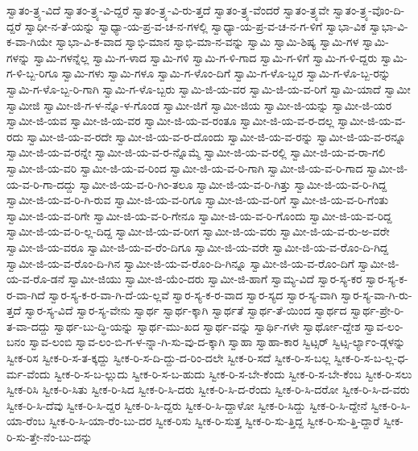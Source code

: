 {ಸ್ವಾತಂ-ತ್ರ್ಯ-ವಿದೆ
ಸ್ವಾತಂ-ತ್ರ್ಯ-ವಿ-ದ್ದರೆ
ಸ್ವಾತಂ-ತ್ರ್ಯ-ವಿ-ರು-ತ್ತದೆ
ಸ್ವಾತಂ-ತ್ರ್ಯ-ವೆಂದರೆ
ಸ್ವಾತಂ-ತ್ರ್ಯವೇ
ಸ್ವಾತಂ-ತ್ರ್ಯ-ವೊಂ-ದಿ-ದ್ದರೆ
ಸ್ವಾಧೀ-ನ-ತೆ-ಯನ್ನು
ಸ್ವಾಧ್ಯಾ-ಯ-ಪ್ರ-ವ-ಚ-ನ-ಗಳಲ್ಲಿ
ಸ್ವಾಧ್ಯಾ-ಯ-ಪ್ರ-ವ-ಚ-ನ-ಗ-ಳಿಗೆ
ಸ್ವಾಭಾ-ವಿಕ
ಸ್ವಾಭಾ-ವಿ-ಕ-ವಾ-ಗಿಯೇ
ಸ್ವಾಭಾ-ವಿ-ಕ-ವಾದ
ಸ್ವಾಭಿ-ಮಾನ
ಸ್ವಾಭಿ-ಮಾ-ನ-ವನ್ನು
ಸ್ವಾಮಿ
ಸ್ವಾಮಿ-ಶಿಷ್ಯ
ಸ್ವಾಮಿ-ಗಳ
ಸ್ವಾಮಿ-ಗಳನ್ನು
ಸ್ವಾಮಿ-ಗಳನ್ನೆಲ್ಲ
ಸ್ವಾಮಿ-ಗ-ಳಾದ
ಸ್ವಾಮಿ-ಗಳಿ
ಸ್ವಾಮಿ-ಗ-ಳಿ-ಗಾದ
ಸ್ವಾಮಿ-ಗ-ಳಿಗೆ
ಸ್ವಾಮಿ-ಗ-ಳಿ-ದ್ದರು
ಸ್ವಾಮಿ-ಗ-ಳಿ-ಬ್ಬ-ರಿಗೂ
ಸ್ವಾಮಿ-ಗಳು
ಸ್ವಾಮಿ-ಗಳೂ
ಸ್ವಾಮಿ-ಗ-ಳೊಂ-ದಿಗೆ
ಸ್ವಾಮಿ-ಗ-ಳೊ-ಬ್ಬರ
ಸ್ವಾಮಿ-ಗ-ಳೊ-ಬ್ಬ-ರನ್ನು
ಸ್ವಾಮಿ-ಗ-ಳೊ-ಬ್ಬ-ರಿ-ಗಾಗಿ
ಸ್ವಾಮಿ-ಗ-ಳೊ-ಬ್ಬರು
ಸ್ವಾಮಿ-ಜಿ-ಯ-ವರ
ಸ್ವಾಮಿ-ಜಿ-ಯ-ವ-ರಿಗೆ
ಸ್ವಾಮಿ-ಯಾದೆ
ಸ್ವಾಮೀ
ಸ್ವಾಮೀಜಿ
ಸ್ವಾಮೀ-ಜಿ-ಗ-ಳ-ನ್ನೊ-ಳ-ಗೊಂಡ
ಸ್ವಾಮೀ-ಜಿಗೆ
ಸ್ವಾಮೀ-ಜಿಯ
ಸ್ವಾಮೀ-ಜಿ-ಯನ್ನು
ಸ್ವಾಮೀ-ಜಿ-ಯರ
ಸ್ವಾಮೀ-ಜಿ-ಯವ
ಸ್ವಾಮೀ-ಜಿ-ಯ-ವರ
ಸ್ವಾಮೀ-ಜಿ-ಯ-ವ-ರಂತೂ
ಸ್ವಾಮೀ-ಜಿ-ಯ-ವ-ರ-ದಲ್ಲ
ಸ್ವಾಮೀ-ಜಿ-ಯ-ವ-ರದು
ಸ್ವಾಮೀ-ಜಿ-ಯ-ವ-ರದೇ
ಸ್ವಾಮೀ-ಜಿ-ಯ-ವ-ರ-ದೊಂದು
ಸ್ವಾಮೀ-ಜಿ-ಯ-ವ-ರನ್ನು
ಸ್ವಾಮೀ-ಜಿ-ಯ-ವ-ರನ್ನೂ
ಸ್ವಾಮೀ-ಜಿ-ಯ-ವ-ರನ್ನೇ
ಸ್ವಾಮೀ-ಜಿ-ಯ-ವ-ರ-ನ್ನೊಮ್ಮೆ
ಸ್ವಾಮೀ-ಜಿ-ಯ-ವ-ರಲ್ಲಿ
ಸ್ವಾಮೀ-ಜಿ-ಯ-ವ-ರಾ-ಗಲಿ
ಸ್ವಾಮೀ-ಜಿ-ಯ-ವರಿ
ಸ್ವಾಮೀ-ಜಿ-ಯ-ವ-ರಿಂದ
ಸ್ವಾಮೀ-ಜಿ-ಯ-ವ-ರಿ-ಗಾಗಿ
ಸ್ವಾಮೀ-ಜಿ-ಯ-ವ-ರಿ-ಗಾದ
ಸ್ವಾಮೀ-ಜಿ-ಯ-ವ-ರಿ-ಗಾ-ದದ್ದು
ಸ್ವಾಮೀ-ಜಿ-ಯ-ವ-ರಿ-ಗಿಂ-ತಲೂ
ಸ್ವಾಮೀ-ಜಿ-ಯ-ವ-ರಿ-ಗಿತ್ತು
ಸ್ವಾಮೀ-ಜಿ-ಯ-ವ-ರಿ-ಗಿದ್ದ
ಸ್ವಾಮೀ-ಜಿ-ಯ-ವ-ರಿ-ಗಿ-ರುವ
ಸ್ವಾಮೀ-ಜಿ-ಯ-ವ-ರಿಗೂ
ಸ್ವಾಮೀ-ಜಿ-ಯ-ವ-ರಿಗೆ
ಸ್ವಾಮೀ-ಜಿ-ಯ-ವ-ರಿ-ಗೆಂತು
ಸ್ವಾಮೀ-ಜಿ-ಯ-ವ-ರಿಗೇ
ಸ್ವಾಮೀ-ಜಿ-ಯ-ವ-ರಿ-ಗೇನೂ
ಸ್ವಾಮೀ-ಜಿ-ಯ-ವ-ರಿ-ಗೊಂದು
ಸ್ವಾಮೀ-ಜಿ-ಯ-ವ-ರಿದ್ದ
ಸ್ವಾಮೀ-ಜಿ-ಯ-ವ-ರಿ-ಲ್ಲ-ದಿದ್ದ
ಸ್ವಾಮೀ-ಜಿ-ಯ-ವ-ರೀಗ
ಸ್ವಾಮೀ-ಜಿ-ಯ-ವರು
ಸ್ವಾಮೀ-ಜಿ-ಯ-ವ-ರು-ಅ-ವರೇ
ಸ್ವಾಮೀ-ಜಿ-ಯ-ವರೂ
ಸ್ವಾಮೀ-ಜಿ-ಯ-ವ-ರೆಂ-ದಿಗೂ
ಸ್ವಾಮೀ-ಜಿ-ಯ-ವರೇ
ಸ್ವಾಮೀ-ಜಿ-ಯ-ವ-ರೊಂ-ದಿ-ಗಿದ್ದ
ಸ್ವಾಮೀ-ಜಿ-ಯ-ವ-ರೊಂ-ದಿ-ಗಿನ
ಸ್ವಾಮೀ-ಜಿ-ಯ-ವ-ರೊಂ-ದಿ-ಗಿನ್ನೂ
ಸ್ವಾಮೀ-ಜಿ-ಯ-ವ-ರೊಂ-ದಿಗೆ
ಸ್ವಾಮೀ-ಜಿ-ಯ-ವ-ರೊ-ಡನೆ
ಸ್ವಾಮೀ-ಜಿಯು
ಸ್ವಾಮೀ-ಜಿ-ಯೆಂ-ದರು
ಸ್ವಾಮೀ-ಜಿ-ಹಾಗೆ
ಸ್ವಾಮ್ಯ-ವಿದೆ
ಸ್ವಾರ-ಸ್ಯ-ಕರ
ಸ್ವಾರ-ಸ್ಯ-ಕ-ರ-ವಾ-ಗಿದೆ
ಸ್ವಾರ-ಸ್ಯ-ಕ-ರ-ವಾ-ಗಿ-ದೆ-ಯ-ಲ್ಲವೆ
ಸ್ವಾರ-ಸ್ಯ-ಕ-ರ-ವಾದ
ಸ್ವಾರ-ಸ್ಯದ
ಸ್ವಾರ-ಸ್ಯ-ವಾಗಿ
ಸ್ವಾರ-ಸ್ಯ-ವಾ-ಗಿ-ರು-ತ್ತದೆ
ಸ್ವಾರ-ಸ್ಯ-ವಿದೆ
ಸ್ವಾರ-ಸ್ಯ-ವೇನು
ಸ್ವಾರ್ಥ
ಸ್ವಾರ್ಥ-ಕ್ಕಾಗಿ
ಸ್ವಾರ್ಥತೆ
ಸ್ವಾರ್ಥ-ತೆ-ಯಿಂದ
ಸ್ವಾರ್ಥದ
ಸ್ವಾರ್ಥ-ಪ್ರೇ-ರಿ-ತ-ವಾ-ದದ್ದು
ಸ್ವಾರ್ಥ-ಬು-ದ್ಧಿ-ಯನ್ನು
ಸ್ವಾರ್ಥ-ಮು-ಖದ
ಸ್ವಾರ್ಥ-ವನ್ನು
ಸ್ವಾರ್ಥಿ-ಗಳೇ
ಸ್ವಾರ್ಥೋ-ದ್ದೇಶ
ಸ್ವಾವ-ಲಂ-ಬನಂ
ಸ್ವಾವ-ಲಂಬಿ
ಸ್ವಾವ-ಲಂ-ಬಿ-ಗ-ಳ-ನ್ನಾ-ಗಿ-ಸು-ವು-ದ-ಕ್ಕಾಗಿ
ಸ್ವಾಹಾ
ಸ್ವಾಹಾ-ಕಾರ
ಸ್ವಿಟ್ಸರ್
ಸ್ವಿಟ್ಸ-ರ್ಲ್ಯಾಂ-ಡ್ಗಳನ್ನು
ಸ್ವೀಕ-ರಿಸ
ಸ್ವೀಕ-ರಿ-ಸ-ತ-ಕ್ಕದ್ದು
ಸ್ವೀಕ-ರಿ-ಸ-ದಿ-ದ್ದು-ದ-ರಿಂ-ದಲೇ
ಸ್ವೀಕ-ರಿ-ಸದೆ
ಸ್ವೀಕ-ರಿ-ಸ-ಬಲ್ಲ
ಸ್ವೀಕ-ರಿ-ಸ-ಬ-ಲ್ಲ-ಧ-ರ್ಮ-ವೆಂದು
ಸ್ವೀಕ-ರಿ-ಸ-ಬ-ಲ್ಲುದು
ಸ್ವೀಕ-ರಿ-ಸ-ಬ-ಹುದು
ಸ್ವೀಕ-ರಿ-ಸ-ಬೇ-ಕೆಂದು
ಸ್ವೀಕ-ರಿ-ಸ-ಬೇ-ಕೆಂಬ
ಸ್ವೀಕ-ರಿ-ಸಲು
ಸ್ವೀಕ-ರಿಸಿ
ಸ್ವೀಕ-ರಿ-ಸಿತು
ಸ್ವೀಕ-ರಿ-ಸಿದ
ಸ್ವೀಕ-ರಿ-ಸಿ-ದರು
ಸ್ವೀಕ-ರಿ-ಸಿ-ದ-ರೆಂದು
ಸ್ವೀಕ-ರಿ-ಸಿ-ದರೋ
ಸ್ವೀಕ-ರಿ-ಸಿ-ದ-ವರು
ಸ್ವೀಕ-ರಿ-ಸಿ-ದೆವು
ಸ್ವೀಕ-ರಿ-ಸಿ-ದ್ದರ
ಸ್ವೀಕ-ರಿ-ಸಿ-ದ್ದರು
ಸ್ವೀಕ-ರಿ-ಸಿ-ದ್ದಾಳೋ
ಸ್ವೀಕ-ರಿ-ಸಿದ್ದು
ಸ್ವೀಕ-ರಿ-ಸಿ-ದ್ದೇನೆ
ಸ್ವೀಕ-ರಿ-ಸಿ-ಯಾ-ರೆಂಬ
ಸ್ವೀಕ-ರಿ-ಸಿ-ಯಾ-ರೆಂ-ಬು-ದರ
ಸ್ವೀಕ-ರಿಸು
ಸ್ವೀಕ-ರಿ-ಸುತ್ತ
ಸ್ವೀಕ-ರಿ-ಸು-ತ್ತಿದ್ದ
ಸ್ವೀಕ-ರಿ-ಸು-ತ್ತಿ-ದ್ದಾರೆ
ಸ್ವೀಕ-ರಿ-ಸು-ತ್ತೇ-ನೆಂ-ಬು-ದನ್ನು
}
